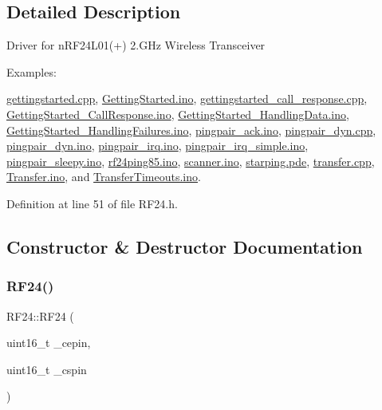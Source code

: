 \subsection{Detailed Description}
Driver for n\+R\+F24\+L01(+) 2.\+G\+Hz Wireless Transceiver \begin{Desc}
\item[Examples\+: ]\par
\hyperlink{gettingstarted_8cpp-example}{gettingstarted.\+cpp}, \hyperlink{GettingStarted_8ino-example}{Getting\+Started.\+ino}, \hyperlink{gettingstarted_call_response_8cpp-example}{gettingstarted\+\_\+call\+\_\+response.\+cpp}, \hyperlink{GettingStarted_CallResponse_8ino-example}{Getting\+Started\+\_\+\+Call\+Response.\+ino}, \hyperlink{GettingStarted_HandlingData_8ino-example}{Getting\+Started\+\_\+\+Handling\+Data.\+ino}, \hyperlink{GettingStarted_HandlingFailures_8ino-example}{Getting\+Started\+\_\+\+Handling\+Failures.\+ino}, \hyperlink{pingpair_ack_8ino-example}{pingpair\+\_\+ack.\+ino}, \hyperlink{pingpair_dyn_8cpp-example}{pingpair\+\_\+dyn.\+cpp}, \hyperlink{pingpair_dyn_8ino-example}{pingpair\+\_\+dyn.\+ino}, \hyperlink{pingpair_irq_8ino-example}{pingpair\+\_\+irq.\+ino}, \hyperlink{pingpair_irq_simple_8ino-example}{pingpair\+\_\+irq\+\_\+simple.\+ino}, \hyperlink{pingpair_sleepy_8ino-example}{pingpair\+\_\+sleepy.\+ino}, \hyperlink{rf24ping85_8ino-example}{rf24ping85.\+ino}, \hyperlink{scanner_8ino-example}{scanner.\+ino}, \hyperlink{starping_8pde-example}{starping.\+pde}, \hyperlink{transfer_8cpp-example}{transfer.\+cpp}, \hyperlink{Transfer_8ino-example}{Transfer.\+ino}, and \hyperlink{TransferTimeouts_8ino-example}{Transfer\+Timeouts.\+ino}.\end{Desc}


Definition at line 51 of file R\+F24.\+h.



\subsection{Constructor \& Destructor Documentation}
\mbox{\label{classRF24_af564e19261afb56005d2411d0c7b05de}} 
\subsubsection{\texorpdfstring{R\+F24()}{RF24()}\hspace{0.1cm}{\footnotesize\ttfamily [1/2]}}
{\footnotesize\ttfamily R\+F24\+::\+R\+F24 (\begin{DoxyParamCaption}\item[{uint16\+\_\+t}]{\+\_\+cepin,  }\item[{uint16\+\_\+t}]{\+\_\+cspin }\end{DoxyParamCaption})}

